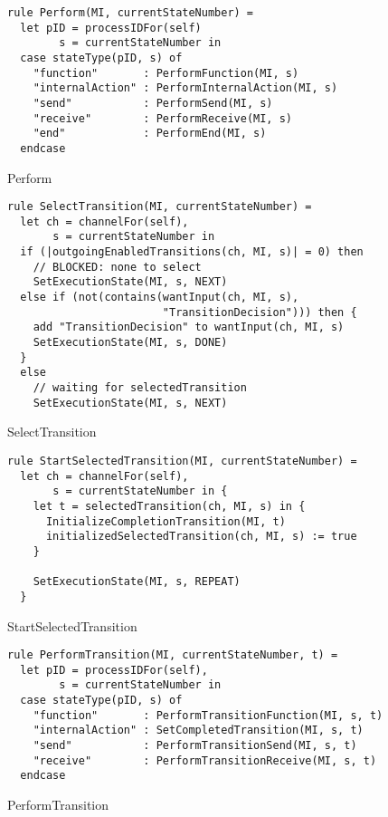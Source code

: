 \begin{listing}[H]
\begin{verbatim}
rule Perform(MI, currentStateNumber) =
  let pID = processIDFor(self)
        s = currentStateNumber in
  case stateType(pID, s) of
    "function"       : PerformFunction(MI, s)
    "internalAction" : PerformInternalAction(MI, s)
    "send"           : PerformSend(MI, s)
    "receive"        : PerformReceive(MI, s)
    "end"            : PerformEnd(MI, s)
  endcase
\end{verbatim}
\caption{Perform}
\label{lst:asm:Perform}
\end{listing}


\begin{listing}[H]
\begin{verbatim}
rule SelectTransition(MI, currentStateNumber) =
  let ch = channelFor(self),
       s = currentStateNumber in
  if (|outgoingEnabledTransitions(ch, MI, s)| = 0) then
    // BLOCKED: none to select
    SetExecutionState(MI, s, NEXT)
  else if (not(contains(wantInput(ch, MI, s),
                        "TransitionDecision"))) then {
    add "TransitionDecision" to wantInput(ch, MI, s)
    SetExecutionState(MI, s, DONE)
  }
  else
    // waiting for selectedTransition
    SetExecutionState(MI, s, NEXT)
\end{verbatim}
\caption{SelectTransition}
\label{lst:asm:SelectTransition}
\end{listing}



\begin{listing}[H]
\begin{verbatim}
rule StartSelectedTransition(MI, currentStateNumber) =
  let ch = channelFor(self),
       s = currentStateNumber in {
    let t = selectedTransition(ch, MI, s) in {
      InitializeCompletionTransition(MI, t)
      initializedSelectedTransition(ch, MI, s) := true
    }

    SetExecutionState(MI, s, REPEAT)
  }
\end{verbatim}
\caption{StartSelectedTransition}
\label{lst:asm:StartSelectedTransition}
\end{listing}




\begin{listing}[H]
\begin{verbatim}
rule PerformTransition(MI, currentStateNumber, t) =
  let pID = processIDFor(self),
        s = currentStateNumber in
  case stateType(pID, s) of
    "function"       : PerformTransitionFunction(MI, s, t)
    "internalAction" : SetCompletedTransition(MI, s, t)
    "send"           : PerformTransitionSend(MI, s, t)
    "receive"        : PerformTransitionReceive(MI, s, t)
  endcase
\end{verbatim}
\caption{PerformTransition}
\label{lst:asm:PerformTransition}
\end{listing}



